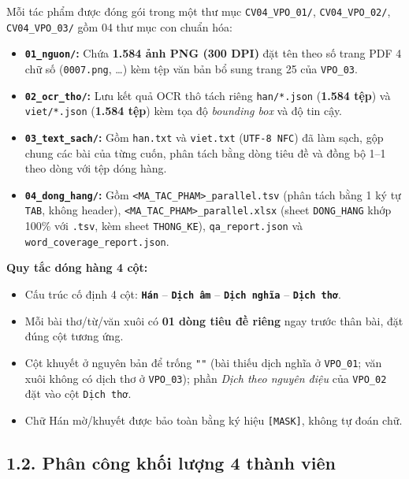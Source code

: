 \documentclass[11pt,a4paper]{article}
\begin{document}
Mỗi tác phẩm được đóng gói trong một thư mục \texttt{CV04\_VPO\_01/}, \texttt{CV04\_VPO\_02/}, \texttt{CV04\_VPO\_03/} gồm 04 thư mục con chuẩn hóa:

\begin{itemize}
    \item \textbf{\texttt{01\_nguon/}:} Chứa \textbf{1.584 ảnh PNG (300 DPI)} đặt tên theo số trang PDF 4 chữ số (\texttt{0007.png}, \dots) kèm tệp văn bản bổ sung trang 25 của \texttt{VPO\_03}.
    \item \textbf{\texttt{02\_ocr\_tho/}:} Lưu kết quả OCR thô tách riêng \texttt{han/*.json} (\textbf{1.584 tệp}) và \texttt{viet/*.json} (\textbf{1.584 tệp}) kèm tọa độ \textit{bounding box} và độ tin cậy.
    \item \textbf{\texttt{03\_text\_sach/}:} Gồm \texttt{han.txt} và \texttt{viet.txt} (\texttt{UTF-8 NFC}) đã làm sạch, gộp chung các bài của từng cuốn, phân tách bằng dòng tiêu đề và đồng bộ 1--1 theo dòng với tệp dóng hàng.
    \item \textbf{\texttt{04\_dong\_hang/}:} Gồm \texttt{<MA\_TAC\_PHAM>\_parallel.tsv} (phân tách bằng 1 ký tự \texttt{TAB}, không header), \texttt{<MA\_TAC\_PHAM>\_parallel.xlsx} (sheet \texttt{DONG\_HANG} khớp 100\% với \texttt{.tsv}, kèm sheet \texttt{THONG\_KE}), \texttt{qa\_report.json} và \texttt{word\_coverage\_report.json}.
\end{itemize}

\noindent\textbf{Quy tắc dóng hàng 4 cột:}
\begin{itemize}
    \item Cấu trúc cố định 4 cột: \textbf{\texttt{Hán}} -- \textbf{\texttt{Dịch âm}} -- \textbf{\texttt{Dịch nghĩa}} -- \textbf{\texttt{Dịch thơ}}.
    \item Mỗi bài thơ/từ/văn xuôi có \textbf{01 dòng tiêu đề riêng} ngay trước thân bài, đặt đúng cột tương ứng.
    \item Cột khuyết ở nguyên bản để trống \texttt{""} (bài thiếu dịch nghĩa ở \texttt{VPO\_01}; văn xuôi không có dịch thơ ở \texttt{VPO\_03}); phần \textit{Dịch theo nguyên điệu} của \texttt{VPO\_02} đặt vào cột \texttt{Dịch thơ}.
    \item Chữ Hán mờ/khuyết được bảo toàn bằng ký hiệu \texttt{[MASK]}, không tự đoán chữ.
\end{itemize}

\subsection{1.2. Phân công khối lượng 4 thành viên}
\end{document}
